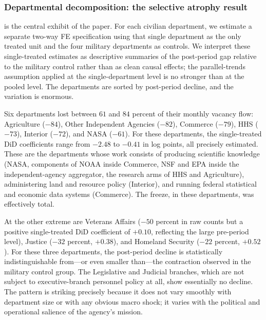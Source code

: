\documentclass[12pt]{article}
\begin{document}


\subsubsection*{Departmental decomposition: the selective atrophy result}  is the central exhibit of the paper. For each civilian department, we estimate a separate two-way FE specification using that single department as the only treated unit and the four military departments as controls. We interpret these single-treated estimates as descriptive summaries of the post-period gap relative to the military control rather than as clean causal effects; the parallel-trends assumption applied at the single-department level is no stronger than at the pooled level. The departments are sorted by post-period decline, and the variation is enormous.



Six departments lost between $61$ and $84$ percent of their monthly vacancy flow: Agriculture ($-84$), Other Independent Agencies ($-82$), Commerce ($-79$), HHS ($-73$), Interior ($-72$), and NASA ($-61$). For these departments, the single-treated DiD coefficients range from $-2.48$ to $-0.41$ in log points, all precisely estimated. These are the departments whose work consists of producing scientific knowledge (NASA, components of NOAA inside Commerce, NSF and EPA inside the independent-agency aggregator, the research arms of HHS and Agriculture), administering land and resource policy (Interior), and running federal statistical and economic data systems (Commerce). The freeze, in these departments, was effectively total.

At the other extreme are Veterans Affairs ($-50$ percent in raw counts but a positive single-treated DiD coefficient of $+0.10$, reflecting the large pre-period level), Justice ($-32$ percent, $+0.38$), and Homeland Security ($-22$ percent, $+0.52$). For these three departments, the post-period decline is statistically indistinguishable from---or even smaller than---the contraction observed in the military control group. The Legislative and Judicial branches, which are not subject to executive-branch personnel policy at all, show essentially no decline. The pattern is striking precisely because it does not vary smoothly with department size or with any obvious macro shock; it varies with the political and operational salience of the agency's mission.
\end{document}
